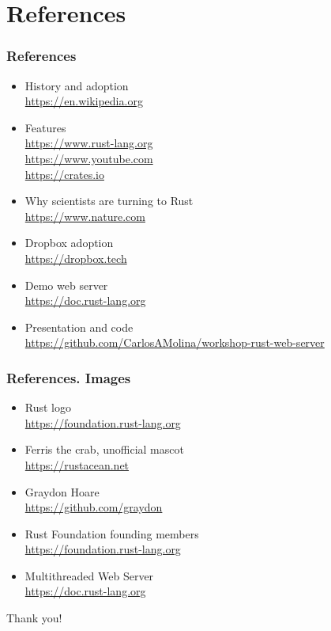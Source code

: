 \documentclass{beamer}
\begin{document}
\section{References}

\begin{frame}
\frametitle{References}
\begin{itemize}
\item History and adoption\\
\href{https://en.wikipedia.org/wiki/Rust_(programming_language)}{https://en.wikipedia.org}
\item Features\\
\href{https://www.rust-lang.org/}{https://www.rust-lang.org}\\
\href{https://www.youtube.com/watch?v=IDpe6k_IIfU}{https://www.youtube.com}\\
\href{https://crates.io/}{https://crates.io}\\
\item Why scientists are turning to Rust\\
\href{https://www.nature.com/articles/d41586-020-03382-2}{https://www.nature.com}
\item Dropbox adoption\\
\href{https://dropbox.tech/infrastructure/rewriting-the-heart-of-our-sync-engine}{https://dropbox.tech}
\item Demo web server\\
\href{https://doc.rust-lang.org/stable/book/ch20-00-final-project-a-web-server.html}{https://doc.rust-lang.org}
\item Presentation and code\\
\href{https://github.com/CarlosAMolina/workshop-rust-web-server}{https://github.com/CarlosAMolina/workshop-rust-web-server}
\end{itemize}
\end{frame}

\begin{frame}
\frametitle{References. Images}
\begin{itemize}
\item Rust logo\\
\href{https://foundation.rust-lang.org/policies/logo-policy-and-media-guide/\#the-rust-trademarks}{https://foundation.rust-lang.org}
\item Ferris the crab, unofficial mascot\\
\href{https://rustacean.net}{https://rustacean.net}
\item Graydon Hoare\\
\href{https://github.com/graydon}{https://github.com/graydon}
\item Rust Foundation founding members\\
\href{https://foundation.rust-lang.org/members/}{https://foundation.rust-lang.org}
\item Multithreaded Web Server\\
\href{https://doc.rust-lang.org/stable/book/ch20-00-final-project-a-web-server.html}{https://doc.rust-lang.org}
\end{itemize}
\end{frame}

\begin{frame}
\Huge{\centerline{Thank you!}}
\end{frame}
\end{document}
